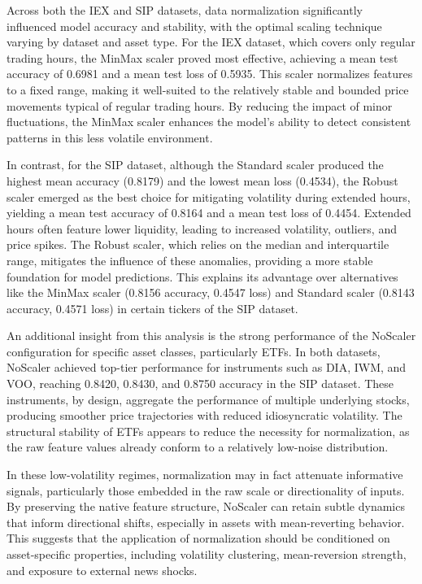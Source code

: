 \documentclass[letterpaper]{article}
\begin{document}
Across both the IEX and SIP datasets, data normalization significantly influenced model accuracy and stability, with the optimal scaling technique varying by dataset and asset type. For the IEX dataset, which covers only regular trading hours, the MinMax scaler proved most effective, achieving a mean test accuracy of 0.6981 and a mean test loss of 0.5935. This scaler normalizes features to a fixed range, making it well-suited to the relatively stable and bounded price movements typical of regular trading hours. By reducing the impact of minor fluctuations, the MinMax scaler enhances the model’s ability to detect consistent patterns in this less volatile environment.

In contrast, for the SIP dataset, although the Standard scaler produced the highest mean accuracy (0.8179) and the lowest mean loss (0.4534), the Robust scaler emerged as the best choice for mitigating volatility during extended hours, yielding a mean test accuracy of 0.8164 and a mean test loss of 0.4454. Extended hours often feature lower liquidity, leading to increased volatility, outliers, and price spikes. The Robust scaler, which relies on the median and interquartile range, mitigates the influence of these anomalies, providing a more stable foundation for model predictions. This explains its advantage over alternatives like the MinMax scaler (0.8156 accuracy, 0.4547 loss) and Standard scaler (0.8143 accuracy, 0.4571 loss) in certain tickers of the SIP dataset.

An additional insight from this analysis is the strong performance of the NoScaler configuration for specific asset classes, particularly ETFs. In both datasets, NoScaler achieved top-tier performance for instruments such as DIA, IWM, and VOO, reaching 0.8420, 0.8430, and 0.8750 accuracy in the SIP dataset. These instruments, by design, aggregate the performance of multiple underlying stocks, producing smoother price trajectories with reduced idiosyncratic volatility. The structural stability of ETFs appears to reduce the necessity for normalization, as the raw feature values already conform to a relatively low-noise distribution.

In these low-volatility regimes, normalization may in fact attenuate informative signals, particularly those embedded in the raw scale or directionality of inputs. By preserving the native feature structure, NoScaler can retain subtle dynamics that inform directional shifts, especially in assets with mean-reverting behavior. This suggests that the application of normalization should be conditioned on asset-specific properties, including volatility clustering, mean-reversion strength, and exposure to external news shocks.
\end{document}
